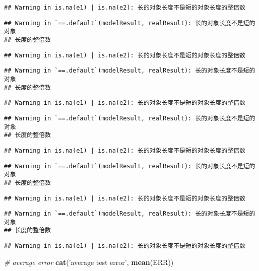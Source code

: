 \documentclass[]{article}
\newenvironment{Shaded}{\begin{snugshade}}{\end{snugshade}}
\newcommand{\CommentTok}[1]{\textcolor[rgb]{0.56,0.35,0.01}{\textit{#1}}}
\newcommand{\KeywordTok}[1]{\textcolor[rgb]{0.13,0.29,0.53}{\textbf{#1}}}
\newcommand{\NormalTok}[1]{#1}
\newcommand{\StringTok}[1]{\textcolor[rgb]{0.31,0.60,0.02}{#1}}
\begin{document}
\begin{verbatim}
## Warning in is.na(e1) | is.na(e2): 长的对象长度不是短的对象长度的整倍数
\end{verbatim}

\begin{verbatim}
## Warning in `==.default`(modelResult, realResult): 长的对象长度不是短的对象
## 长度的整倍数
\end{verbatim}

\begin{verbatim}
## Warning in is.na(e1) | is.na(e2): 长的对象长度不是短的对象长度的整倍数
\end{verbatim}

\begin{verbatim}
## Warning in `==.default`(modelResult, realResult): 长的对象长度不是短的对象
## 长度的整倍数
\end{verbatim}

\begin{verbatim}
## Warning in is.na(e1) | is.na(e2): 长的对象长度不是短的对象长度的整倍数
\end{verbatim}

\begin{verbatim}
## Warning in `==.default`(modelResult, realResult): 长的对象长度不是短的对象
## 长度的整倍数
\end{verbatim}

\begin{verbatim}
## Warning in is.na(e1) | is.na(e2): 长的对象长度不是短的对象长度的整倍数
\end{verbatim}

\begin{verbatim}
## Warning in `==.default`(modelResult, realResult): 长的对象长度不是短的对象
## 长度的整倍数
\end{verbatim}

\begin{verbatim}
## Warning in is.na(e1) | is.na(e2): 长的对象长度不是短的对象长度的整倍数
\end{verbatim}

\begin{verbatim}
## Warning in `==.default`(modelResult, realResult): 长的对象长度不是短的对象
## 长度的整倍数
\end{verbatim}

\begin{verbatim}
## Warning in is.na(e1) | is.na(e2): 长的对象长度不是短的对象长度的整倍数
\end{verbatim}

\begin{Shaded}
\begin{Highlighting}[]
\CommentTok{# average error}
\KeywordTok{cat}\NormalTok{(}\StringTok{'average test error'}\NormalTok{, }\KeywordTok{mean}\NormalTok{(ERR))}
\end{Highlighting}
\end{Shaded}
\end{document}

